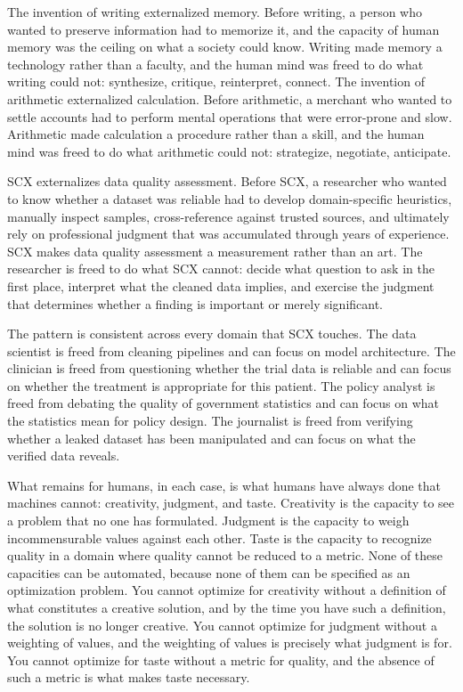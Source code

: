 \documentclass[12pt,a4paper]{article}
\begin{document}
The invention of writing externalized memory. Before writing, a person who wanted to preserve information had to memorize it, and the capacity of human memory was the ceiling on what a society could know. Writing made memory a technology rather than a faculty, and the human mind was freed to do what writing could not: synthesize, critique, reinterpret, connect. The invention of arithmetic externalized calculation. Before arithmetic, a merchant who wanted to settle accounts had to perform mental operations that were error-prone and slow. Arithmetic made calculation a procedure rather than a skill, and the human mind was freed to do what arithmetic could not: strategize, negotiate, anticipate.

SCX externalizes data quality assessment. Before SCX, a researcher who wanted to know whether a dataset was reliable had to develop domain-specific heuristics, manually inspect samples, cross-reference against trusted sources, and ultimately rely on professional judgment that was accumulated through years of experience. SCX makes data quality assessment a measurement rather than an art. The researcher is freed to do what SCX cannot: decide what question to ask in the first place, interpret what the cleaned data implies, and exercise the judgment that determines whether a finding is important or merely significant.

The pattern is consistent across every domain that SCX touches. The data scientist is freed from cleaning pipelines and can focus on model architecture. The clinician is freed from questioning whether the trial data is reliable and can focus on whether the treatment is appropriate for this patient. The policy analyst is freed from debating the quality of government statistics and can focus on what the statistics mean for policy design. The journalist is freed from verifying whether a leaked dataset has been manipulated and can focus on what the verified data reveals.

What remains for humans, in each case, is what humans have always done that machines cannot: creativity, judgment, and taste. Creativity is the capacity to see a problem that no one has formulated. Judgment is the capacity to weigh incommensurable values against each other. Taste is the capacity to recognize quality in a domain where quality cannot be reduced to a metric. None of these capacities can be automated, because none of them can be specified as an optimization problem. You cannot optimize for creativity without a definition of what constitutes a creative solution, and by the time you have such a definition, the solution is no longer creative. You cannot optimize for judgment without a weighting of values, and the weighting of values is precisely what judgment is for. You cannot optimize for taste without a metric for quality, and the absence of such a metric is what makes taste necessary.
\end{document}
